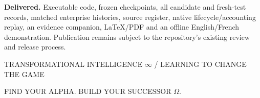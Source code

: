 \documentclass[11pt,letterpaper]{article}
\begin{document}
\textbf{Delivered.} Executable code, frozen checkpoints, all candidate and fresh-test records, matched enterprise histories, source register, native lifecycle/accounting replay, an evidence companion, LaTeX/PDF and an offline English/French demonstration. Publication remains subject to the repository's existing review and release process.

\vfill
{\small\sffamily\color{navy}TRANSFORMATIONAL INTELLIGENCE $\infty$ / LEARNING TO CHANGE THE GAME\par FIND YOUR ALPHA. BUILD YOUR SUCCESSOR $\Omega$.}
\end{document}
